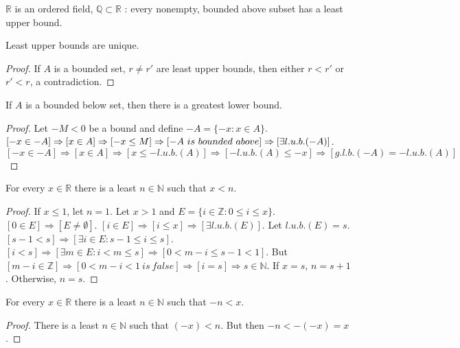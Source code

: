\documentclass[crop=false,class=article,oneside]{standalone}
\begin{document}
            \begin{definition}
            $\mathbb{R}$ is an ordered field, $\mathbb{Q}\subset \mathbb{R}$ : every nonempty, bounded above subset has a least upper bound.
            \end{definition}
            \begin{theorem}
            Least upper bounds are unique.
            \end{theorem}
            \begin{proof}
            If $A$ is a bounded set, $r\ne r'$ are least upper bounds, then either $r<r'$ or $r'<r$, a contradiction.
            \end{proof}
            \begin{theorem}
            If $A$ is a bounded below set, then there is a greatest lower bound.
            \end{theorem}
            \begin{proof}
            Let $-M<0$ be a bound and define $-A = \{-x: x\in A\}$. $[-x\in -A]\Rightarrow [x\in A]\Rightarrow [-x\leq M]\Rightarrow [-A\ is\ bounded\ above]\\ \Rightarrow [\exists l.u.b.(-A)]$. $[-x\in -A]\Rightarrow [x\in A]\Rightarrow [x\leq -l.u.b.(A)]\Rightarrow [-l.u.b.(A)\leq -x]\Rightarrow [g.l.b.(-A)=-l.u.b.(A)]$
            \end{proof}
            \begin{theorem}
            For every $x\in \mathbb{R}$ there is a least $n\in \mathbb{N}$ such that $x<n$. 
            \end{theorem}
            \begin{proof}
            If $x\leq1$, let $n=1$. Let $x>1$ and $E=\{i \in \mathbb{Z}: 0 \leq i \leq x\}$. $[0\in E]\Rightarrow [E\ne \emptyset]$. $[i\in E]\Rightarrow [i\leq x]\Rightarrow [\exists l.u.b.(E)]$. Let $l.u.b.(E)=s$. $[s-1<s]\Rightarrow [\exists i \in E:s-1 \leq i \leq s]$. $[i< s]\Rightarrow[\exists m\in E: i < m \leq s]\Rightarrow [0 < m-i \leq s-1 < 1]$. But $[m-i \in \mathbb{Z}]\Rightarrow [0<m-i<1\ is\ false]\Rightarrow [i = s]\Rightarrow s\in \mathbb{N}$. If $x=s$, $n = s+1$. Otherwise, $n=s$.
            \end{proof}
            \begin{corollary}
            For every $x\in \mathbb{R}$ there is a least $n\in \mathbb{N}$ such that $-n<x$.
            \end{corollary}
            \begin{proof}
            There is a least $n\in \mathbb{N}$ such that $(-x)<n$. But then $-n <-(-x) = x$. 
            \end{proof}
\end{document}
